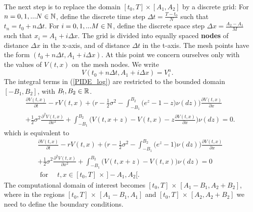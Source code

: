 The next step is to replace the domain $[t_0,T]\times [A_1,A_2]$ by a discrete grid:
For $n = 0,1, ... N \in \mathbb{N}$, define the discrete time step $ \Delta t = \frac{T - t_0}{N} $ such that
$t_n = t_0 + n \Delta t$. For $i = 0,1, ... M \in \mathbb{N}$, define the discrete space step $ \Delta x = \frac{A_2 - A_1}{M} $ such that
$x_i = A_1 + i \Delta x$.
The grid is divided into equally spaced \textbf{nodes} of distance $\Delta x$ in the x-axis, and of distance $\Delta t$ in the t-axis.
The mesh points have the form $(t_0 + n \Delta t, A_1 + i \Delta x)$.
At this point we concern ourselves only with the values of $V(t,x)$ on the mesh nodes. We write 
$$ V(t_0 + n \Delta t, A_1 + i \Delta x) = V^n_i .$$
The integral terms in (\ref{PIDE_log}) are restricted to the bounded domain $[-B_1,B_2]$, with $B_!,B_2 \in \mathbb{R}$.
\begin{align*}
&  \frac{\partial V(t,x)}{\partial t} - r V(t,x) 
          + \biggl( r -\frac{1}{2}\sigma^2 - \int_{-B_1}^{B_2} \bigl( e^z-1-z \bigr) \nu(dz) \biggr) \frac{\partial V(t,x)}{\partial x} \\ \nonumber
          &+ \frac{1}{2} \sigma^2 \frac{\partial^2 V(t,x)}{\partial x^2} 
          + \int_{-B_1}^{B_2} \bigl( V(t,x+z)- V(t,x) - z \frac{\partial V(t,x)}{\partial x} \bigr) \nu(dz)  = 0.
\end{align*}
which is equivalent to 
\begin{align}\label{restricted_domain}
&  \frac{\partial V(t,x)}{\partial t} - r V(t,x) 
          + \biggl( r -\frac{1}{2}\sigma^2 - \int_{-B_1}^{B_2} \bigl( e^z-1 \bigr) \nu(dz) \biggr) \frac{\partial V(t,x)}{\partial x} \\ \nonumber
          &+ \frac{1}{2} \sigma^2 \frac{\partial^2 V(t,x)}{\partial x^2} 
          + \int_{-B_1}^{B_2} \bigl( V(t,x+z)- V(t,x) \bigr) \nu(dz)  = 0 \\ \nonumber
          & \mbox{ for } \quad t,x \in [t_0,T]\, \times \, ]-A_1,A_2[.
\end{align}
The computational domain of interest becomes $[t_0,T]\, \times \, [A_1-B_1,A_2+B_2]$, where in the regions $[t_0,T]\, \times \, [A_1-B_1,A_1]$ and 
$[t_0,T]\, \times \, [A_2,A_2+B_2]$ we need to define the boundary conditions.

